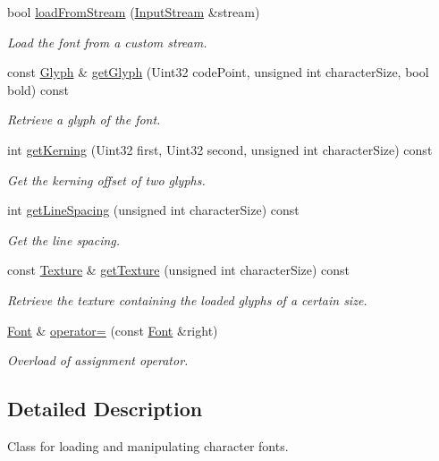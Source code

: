 \begin{DoxyCompactItemize}
bool \hyperlink{classsf_1_1Font_abc3f37a354ce8b9a21f8eb93bd9fdafb}{load\-From\-Stream} (\hyperlink{classsf_1_1InputStream}{Input\-Stream} \&stream)
\begin{DoxyCompactList}\small\item\em Load the font from a custom stream. \end{DoxyCompactList}\item 
const \hyperlink{classsf_1_1Glyph}{Glyph} \& \hyperlink{classsf_1_1Font_a148eb92890113052f12f8a231ad619b9}{get\-Glyph} (Uint32 code\-Point, unsigned int character\-Size, bool bold) const 
\begin{DoxyCompactList}\small\item\em Retrieve a glyph of the font. \end{DoxyCompactList}\item 
int \hyperlink{classsf_1_1Font_a4093f7d2d195c88ea90b34cf14e003c8}{get\-Kerning} (Uint32 first, Uint32 second, unsigned int character\-Size) const 
\begin{DoxyCompactList}\small\item\em Get the kerning offset of two glyphs. \end{DoxyCompactList}\item 
int \hyperlink{classsf_1_1Font_a05f23b88b13bd094083da5b7efc94371}{get\-Line\-Spacing} (unsigned int character\-Size) const 
\begin{DoxyCompactList}\small\item\em Get the line spacing. \end{DoxyCompactList}\item 
const \hyperlink{classsf_1_1Texture}{Texture} \& \hyperlink{classsf_1_1Font_a887368a4e6a3dfa32dea89d2af315951}{get\-Texture} (unsigned int character\-Size) const 
\begin{DoxyCompactList}\small\item\em Retrieve the texture containing the loaded glyphs of a certain size. \end{DoxyCompactList}\item 
\hyperlink{classsf_1_1Font}{Font} \& \hyperlink{classsf_1_1Font_a232515549846e3172a514d0b47918399}{operator=} (const \hyperlink{classsf_1_1Font}{Font} \&right)
\begin{DoxyCompactList}\small\item\em Overload of assignment operator. \end{DoxyCompactList}\end{DoxyCompactItemize}


\subsection{Detailed Description}
Class for loading and manipulating character fonts. 

